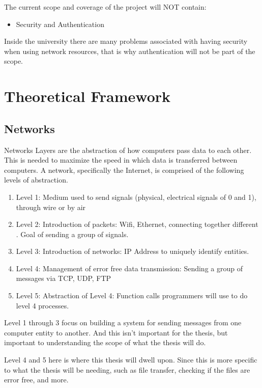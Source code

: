 \documentclass{article}
\begin{document}
The current scope and coverage of the project will NOT contain:

\begin{itemize}
    \item Security and Authentication
\end{itemize}

Inside the university there are many problems associated with having security when using network resources, that is why authentication will not be part of the scope.

\section{Theoretical Framework}

\subsection{Networks}

Networks Layers are the abstraction of how computers pass data to each other. This is needed to maximize the speed in which data is transferred between computers. A network, specifically the Internet, is comprised of the following levels of abstraction. \autocite{kurose}
\begin{enumerate}
    \item Level 1: Medium used to send signals (physical, electrical signals of 0
and 1), through wire or by air
    \item Level 2: Introduction of packets: Wifi, Ethernet, connecting together
different . Goal of sending a group of signals.
    \item Level 3: Introduction of networks: IP Address to uniquely identify
entities.
    \item Level 4: Management of error free data transmission: Sending a group
of messages via TCP, UDP, FTP
    \item Level 5: Abstraction of Level 4: Function calls programmers will use
to do level 4 processes.
\end{enumerate}

Level 1 through 3 focus on building a system for sending messages from one computer entity to another. And this isn't important for the thesis, but important to understanding the scope of what the thesis will do.

Level 4 and 5 here is where this thesis will dwell upon. Since this is more specific to what the thesis will be needing, such as file transfer, checking if the files are error free, and more.
\end{document}
